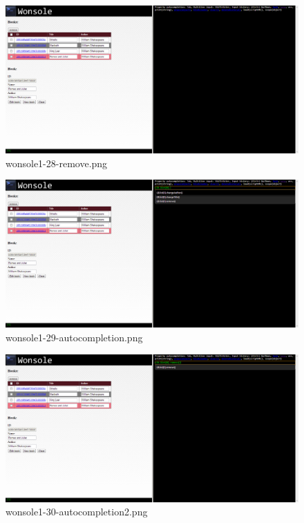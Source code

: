 \begin{figure}
\includegraphics[width=\textwidth]{screenshot/wonsole1-28-remove.png}
\caption{wonsole1-28-remove.png}
\label{wonsole1-28-remove.png}
\end{figure}


\clearpage
\begin{figure}
\includegraphics[width=\textwidth]{screenshot/wonsole1-29-autocompletion.png}
\caption{wonsole1-29-autocompletion.png}
\label{wonsole1-29-autocompletion.png}
\end{figure}


\begin{figure}
\includegraphics[width=\textwidth]{screenshot/wonsole1-30-autocompletion2.png}
\caption{wonsole1-30-autocompletion2.png}
\label{wonsole1-30-autocompletion2.png}
\end{figure}


